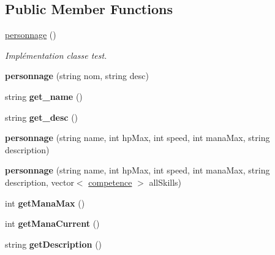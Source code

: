 \subsection*{Public Member Functions}
\begin{DoxyCompactItemize}
\item 
\mbox{\label{classpersonnage_acd9ca516f8c5c110687e5167dab8db59}} 
\hyperlink{classpersonnage_acd9ca516f8c5c110687e5167dab8db59}{personnage} ()
\begin{DoxyCompactList}\small\item\em Implémentation classe test. \end{DoxyCompactList}\item 
\mbox{\label{classpersonnage_a14cb4da97b302a334b6233aa1794dec1}} 
{\bfseries personnage} (string nom, string desc)
\item 
\mbox{\label{classpersonnage_adda382a3e4c225adbf3f4844a21318e3}} 
string {\bfseries get\+\_\+name} ()
\item 
\mbox{\label{classpersonnage_af909a1369afba7df477b3e93bdd6e8a5}} 
string {\bfseries get\+\_\+desc} ()
\item 
\mbox{\label{classpersonnage_a561cf50442dfa2ec280e88656f1f4c4b}} 
{\bfseries personnage} (string name, int hp\+Max, int speed, int mana\+Max, string description)
\item 
\mbox{\label{classpersonnage_a9e18a25ac9b16414d1b4d62570e7f27d}} 
{\bfseries personnage} (string name, int hp\+Max, int speed, int mana\+Max, string description, vector$<$ \hyperlink{classcompetence}{competence} $>$ all\+Skills)
\item 
\mbox{\label{classpersonnage_ad7e16ec80e6339309f1acc579b8108e1}} 
int {\bfseries get\+Mana\+Max} ()
\item 
\mbox{\label{classpersonnage_a0a1c3d6ae4ffad103cb5ecf9f97b83a3}} 
int {\bfseries get\+Mana\+Current} ()
\item 
\mbox{\label{classpersonnage_ab44233d4f15d3689fa20f108f49303df}} 
string {\bfseries get\+Description} ()

\end{DoxyCompactItemize}

